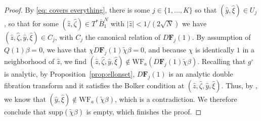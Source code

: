 \documentclass[11pt]{amsart}
\theoremstyle{definition}
\numberwithin{equation}{section}
\newcommand{\abs}[1]{\lvert #1 \rvert}          %
\newcommand{\supp}{\mathrm{supp}}
\begin{document}
\begin{proof}
	By \eqref{eq: covers everything}, there is some $j \in \{1,\dots, K\}$ so that $(\hat y,\hat \xi) \in U_j$, so that for some $(\hat z,\hat \zeta)\in T^* \bar{B}_1^{N}$ with $\abs{\hat z}<1/(2\sqrt{N})$ we have $(\hat z,\hat \zeta, \hat y,\hat \xi) \in C_j$, with $C_j$ the canonical relation of $D\mathbf{F}_j(1)$. By assumption of $Q(1)\beta =0$, we have that $\chi D\mathbf{F}_j(1)\tilde{\chi} \beta=0$, and because $\chi$ is identically $1$ in a neighborhood of $\hat z$, we find $(\hat z,\hat \zeta,\hat y,\hat\xi)\not\in \mathrm{WF}_a(D\mathbf{F}_j(1)\tilde{\chi}\beta)$. Recalling that $g^\circ$ is analytic, by Proposition~\ref{prop:ellonset}, $D\mathbf{F}_j(1)$ is an analytic double fibration transform and it satisfies the Bolker condition at $(\hat z,\hat \zeta,\hat y,\hat\xi)$. Thus, by \cite[Thm.~1.2]{MST}, we know that $(\hat y,\hat \xi) \not\in\mathrm{WF}_a(\tilde{\chi}\beta)$, which is a contradiction. We therefore conclude that $\supp(\tilde{\chi}\beta)$ is empty, which finishes the proof. 
\end{proof}
\end{document}
